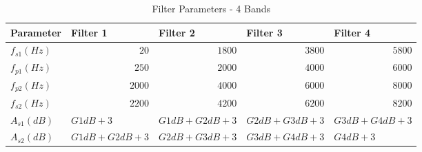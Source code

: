 \documentclass[11pt,onecolumn]{witseiepaper}
\begin{document}
\begin{appendices}
\begin{table}[htbp]
  \centering
  \caption{Filter Parameters - 4 Bands}
  \begin{adjustbox}{width=0.9\linewidth}
    \begin{tabular}{|l|l|l|l|l|}
    \hline
    \textbf{Parameter} & \textbf{Filter 1} & \textbf{Filter 2} & \textbf{Filter 3} & \textbf{Filter 4} \\
    \hline
    $f_{s1} (Hz)$   & \multicolumn{1}{r|}{$20$} & \multicolumn{1}{r|}{$1800$} & \multicolumn{1}{r|}{$3800$} & \multicolumn{1}{r|}{$5800$} \\
    \hline
    $f_{p1} (Hz)$   & \multicolumn{1}{r|}{$250$} & \multicolumn{1}{r|}{$2000$} & \multicolumn{1}{r|}{$4000$} & \multicolumn{1}{r|}{$6000$} \\
    \hline
    $f_{p2} (Hz)$   & \multicolumn{1}{r|}{$2000$} & \multicolumn{1}{r|}{$4000$} & \multicolumn{1}{r|}{$6000$} & \multicolumn{1}{r|}{$8000$} \\
    \hline
    $f_{s2} (Hz)$   & \multicolumn{1}{r|}{$2200$} & \multicolumn{1}{r|}{$4200$} & \multicolumn{1}{r|}{$6200$} & \multicolumn{1}{r|}{$8200$} \\
    \hline
    $A_{s1} (dB)  $ &$ G1dB + 3 $&$ G1dB + G2dB + 3 $&$ G2dB + G3dB + 3$ & $G3dB + G4dB + 3$ \\
    \hline
    $A_{s2} (dB)$   & $G1dB + G2dB + 3$ & $G2dB + G3dB + 3 $& $G3dB + G4dB + 3$ &$ G4dB + 3 $\\
    \hline
    \end{tabular}%
    \end{adjustbox}
  \label{tab:filtPara4Band}%
\end{table}%


\end{appendices}
\end{document}
